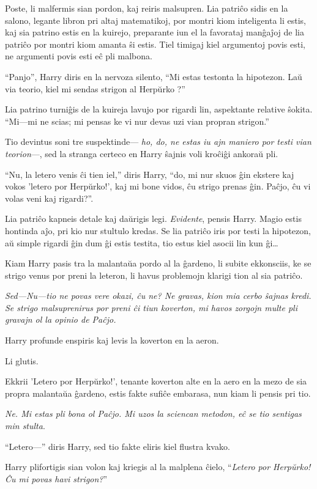 Poste, li malfermis sian pordon, kaj reiris malsupren. Lia patriĉo sidis en la
salono, legante libron pri altaj matematikoj, por montri kiom inteligenta li
estis, kaj sia patrino estis en la kuirejo, preparante iun el la favorataj
manĝaĵoj de lia patriĉo por montri kiom amanta ŝi estis. Tiel timigaj kiel
argumentoj povis esti, ne argumenti povis esti eĉ pli malbona.

``Panjo'', Harry diris en la nervoza silento, ``Mi estas testonta la hipotezon.
Laŭ via teorio, kiel mi sendas strigon al Herpŭrko ?''

Lia patrino turniĝis de la kuireja lavujo por rigardi lin, aspektante relative
ŝokita. ``Mi—mi ne scias; mi pensas ke vi nur devas uzi vian propran strigon.''

Tio devintus soni tre suspektinde— \emph{ho, do, ne estas iu ajn maniero por
testi vian teorion}—, sed la stranga certeco en Harry ŝajnis voli kroĉiĝi
ankoraŭ pli.

``Nu, la letero venis ĉi tien iel,'' diris Harry, ``do, mi nur skuos ĝin ekstere
kaj vokos 'letero por Herpŭrko!', kaj mi bone vidos, ĉu strigo prenas ĝin.
Paĉjo, ĉu vi volas veni kaj rigardi?''.

Lia patriĉo kapneis detale kaj daŭrigis legi. \emph{Evidente}, pensis Harry.
Magio estis hontinda aĵo, pri kio nur stultulo kredas. Se lia patriĉo iris por
testi la hipotezon, aŭ simple rigardi ĝin dum ĝi estis testita, tio estus kiel
asocii lin kun ĝi\ldots{}

Kiam Harry pasis tra la malantaŭa pordo al la ĝardeno, li subite ekkonsciis, ke
se strigo venus por preni la leteron, li havus problemojn klarigi tion al sia
patriĉo.

\emph{Sed—Nu—tio ne povas vere okazi, ĉu ne? Ne gravas, kion mia cerbo ŝajnas
kredi. Se strigo malsuprenirus por preni ĉi tiun koverton, mi havos zorgojn
multe pli gravajn ol la opinio de Paĉjo.}

Harry profunde enspiris kaj levis la koverton en la aeron.

Li glutis.

Ekkrii 'Letero por Herpŭrko!', tenante koverton alte en la aero en la mezo de
sia propra malantaŭa ĝardeno, estis fakte sufiĉe embarasa, nun kiam li pensis
pri tio.

\emph{Ne. Mi estas pli bona ol Paĉjo. Mi uzos la sciencan metodon, eĉ se tio
sentigas min stulta}.

``Letero—'' diris Harry, sed tio fakte eliris kiel flustra kvako.

Harry plifortigis sian volon kaj kriegis al la malplena ĉielo, ``\emph{Letero
por Herpŭrko! Ĉu mi povas havi strigon?}''

